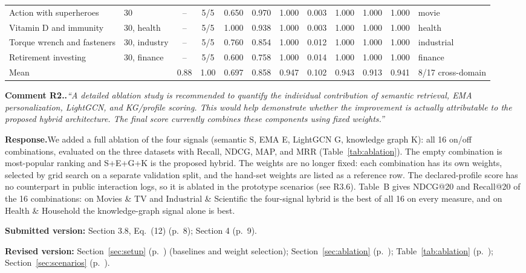 \documentclass[10pt]{article}
\let\colrule\midrule
\let\botrule\bottomrule
\newcounter{rc}
\newcommand{\point}[2]{\stepcounter{rc}%
  \par\medskip\noindent\textbf{Comment #1.\arabic{rc}.}\enspace\textit{``#2''}\par}
\newcommand{\response}{\noindent\textbf{Response.}\enspace}
\newcommand{\where}[2]{\par\noindent\textbf{Submitted version:} #1\par\noindent\textbf{Revised version:} #2\par}
\newcommand{\sect}[1]{Section~\ref{#1} (p.~\pageref{#1})}
\newcommand{\tabl}[1]{Table~\ref{#1} (p.~\pageref{#1})}
\begin{document}
\begin{center}
\begin{tabular*}{\linewidth}{@{\extracolsep{\fill}}llcccccccccl@{}}
Action with superheroes & 30 & -- & 5/5 & 0.650 & 0.970 & 1.000 & 0.003 & 1.000 & 1.000 & 1.000 & movie \\
Vitamin D and immunity & 30, health & -- & 5/5 & 1.000 & 0.938 & 1.000 & 0.003 & 1.000 & 1.000 & 1.000 & health \\
Torque wrench and fasteners & 30, industry & -- & 5/5 & 0.760 & 0.854 & 1.000 & 0.012 & 1.000 & 1.000 & 1.000 & industrial \\
Retirement investing & 30, finance & -- & 5/5 & 0.600 & 0.758 & 1.000 & 0.014 & 1.000 & 1.000 & 1.000 & finance \\
\colrule
Mean &  & 0.88 & 1.00 & 0.697 & 0.858 & 0.947 & 0.102 & 0.943 & 0.913 & 0.941 & 8/17 cross-domain \\
\botrule
\end{tabular*}
\end{center}

\point{R2}{A detailed ablation study is recommended to quantify the individual contribution of semantic retrieval, EMA personalization, LightGCN, and KG/profile scoring. This would help demonstrate whether the improvement is actually attributable to the proposed hybrid architecture. The final score currently combines these components using fixed weights.}
\response We added a full ablation of the four signals (semantic S, EMA E, LightGCN G, knowledge graph K): all 16 on/off combinations, evaluated on the three datasets with Recall, NDCG, MAP, and MRR (Table~\ref{tab:ablation}). The empty combination is most-popular ranking and S+E+G+K is the proposed hybrid. The weights are no longer fixed: each combination has its own weights, selected by grid search on a separate validation split, and the hand-set weights are listed as a reference row. The declared-profile score has no counterpart in public interaction logs, so it is ablated in the prototype scenarios (see R3.6). Table~B gives NDCG@20 and Recall@20 of the 16 combinations: on Movies \& TV and Industrial \& Scientific the four-signal hybrid is the best of all 16 on every measure, and on Health \& Household the knowledge-graph signal alone is best.
\where{Section 3.8, Eq.~(12) (p.~8); Section 4 (p.~9).}{\sect{sec:setup} (baselines and weight selection); \sect{sec:ablation}; \tabl{tab:ablation}; \sect{sec:scenarios}.}
\end{document}

